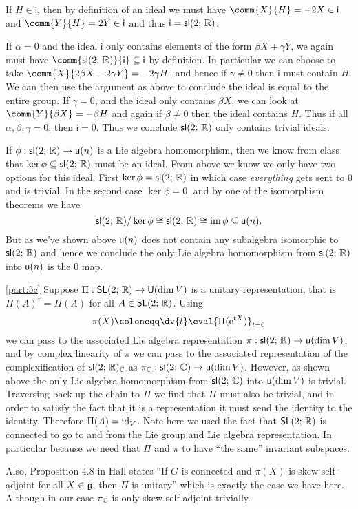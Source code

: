 \documentclass[
	pages,
	boxes,
	color=WildStrawberry
]{homework}
\theoremstyle{plain}
\begin{document}
\begin{solution}
	If $H\in\mathsf{i}$, then by definition of an ideal we must have $\comm{X}{H} = -2X\in\mathsf{i}$ and $\comm{Y}{H} = 2Y\in\mathsf{i}$ and thus $\mathsf{i} = \mathsf{sl}(2;\, \mathbb{R})$.

	If $\alpha = 0$ and the ideal $\mathsf{i}$ only contains elements of the form $\beta X + \gamma Y$, we again must have $\comm{\slie{2}{\R}}{\mathsf{i}}\subseteq \mathsf{i}$ by definition. In particular we can choose to take $\comm{X}{2\beta X - 2\gamma Y} = -2\gamma H$, and hence if $\gamma \neq 0$ then $\mathsf{i}$ must contain $H$. We can then use the argument as above to conclude the ideal is equal to the entire group. If $\gamma = 0$, and the ideal only contains $\beta X$, we can look at $\comm{Y}{\beta X} = -\beta H$ and again if $\beta \neq 0$ then the ideal contains $H$. Thus if all $\alpha, \beta, \gamma = 0$, then $\mathsf{i} = \qty{0}$. Thus we conclude $\mathsf{sl}(2;\, \mathbb{R})$ only contains trivial ideals.

	If $\phi: \mathsf{sl}(2;\, \mathbb{R}) \to \mathsf{u}(n)$ is a Lie algebra homomorphism, then we know from class that $\ker\phi\subseteq\mathsf{sl}(2;\, \mathbb{R})$ must be an ideal. From above we know we only have two options for this ideal. First $\ker\phi = \mathsf{sl}(2;\, \mathbb{R})$ in which case \emph{everything} gets sent to $0$ and is trivial. In the second case $\ker\phi = \qty{0}$, and by one of the isomorphism theorems we have
	\begin{equation*}
		\mathsf{sl}(2;\, \mathbb{R})/\ker{\phi}\cong\mathsf{sl}(2;\, \mathbb{R})\cong\operatorname{im}{\phi}\subseteq\mathsf{u}(n).
	\end{equation*}
	But as we've shown above $\mathsf{u}(n)$ does not contain any subalgebra isomorphic to $\mathsf{sl}(2;\, \mathbb{R})$ and hence we conclude the only Lie algebra homomorphism from $\mathsf{sl}(2;\, \mathbb{R})$ into $\mathsf{u}(n)$ is the $0$ map.

	\ref{part:5c}
	Suppose $\Pi:\mathsf{SL}(2;\, \mathbb{R}) \to \mathsf{U}(\dim V)$ is a unitary representation, that is $\Pi(A)^\dagger = \Pi(A)$ for all $A \in \mathsf{SL}(2;\, \mathbb{R})$. Using
	\begin{equation*}
		\pi(X) \defeq \dv{t}\eval{\Pi(\e^{tX})}_{t=0}
	\end{equation*}
	we can pass to the associated Lie algebra representation $\pi: \mathsf{sl}(2;\, \mathbb{R})\to\mathsf{u}(\dim V)$, and by complex linearity of $\pi$ we can pass to the associated representation of the complexification of $\mathsf{sl}(2;\, \mathbb{R})_{\mathbb{C}}$ as $\pi_{\mathbb{C}}: \mathsf{sl}(2;\, \mathbb{C}) \to \mathsf{u}(\dim V)$. However, as shown above the only Lie algebra homomorphism from $\mathsf{sl}(2;\, \mathbb{C})$ into $\mathsf{u}(\dim V)$ is trivial. Traversing back up the chain to $\Pi$ we find that $\Pi$ must also be trivial, and in order to satisfy the fact that it is a representation it must send the identity to the identity. Therefore $\Pi(A) = \operatorname{id}_V$. Note here we used the fact that $\mathsf{SL}(2;\, \mathbb{R})$ is connected to go to and from the Lie group and Lie algebra representation. In particular because we need that $\Pi$ and $\pi$ to have ``the same'' invariant subspaces.

	Also, Proposition 4.8 in Hall states ``If $G$ is connected and $\pi(X)$ is skew self-adjoint for all $X\in\mathfrak{g}$, then $\Pi$ is unitary'' which is exactly the case we have here. Although in our case $\pi_{\mathbb{C}}$ is only skew self-adjoint trivially.
\end{solution}
\end{document}

